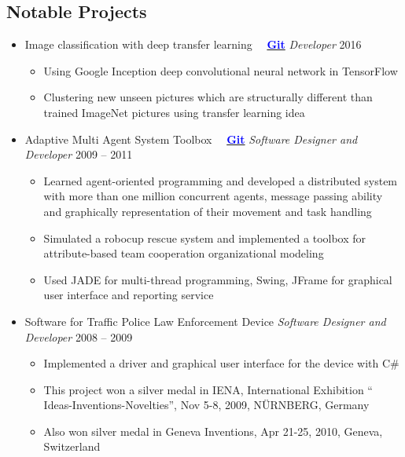\documentclass[letter]{res}
\begin{document}
\begin{resume}
		
		\section{Notable Projects}
		\begin{itemize}[leftmargin=-.1in]
			\item Image classification with deep transfer learning
			~~{\href{https://github.com/omid55/deep_transfer_learning}{\textbf{\textcolor{blue}{Git}}}} \newline
			{\sl Developer} \hfill 2016\\
			\vspace{-4mm}
			\iflong
			\begin{itemize}
				\item Using Google Inception deep convolutional neural network in TensorFlow
				\item Clustering new unseen pictures which are structurally different than trained ImageNet pictures using transfer learning idea
			\end{itemize}
			\fi
		
			\item Adaptive Multi Agent System Toolbox ~~{\href{https://github.com/omid55/team_based_rescue_jade_multi_agent_system}{\textbf{\textcolor{blue}{Git}}}} \newline
			{\sl Software Designer and Developer} \hfill 2009 – 2011\\
			\vspace{-4mm}
			\iflong
			\begin{itemize}
				\item Learned agent-oriented programming and developed a distributed system with more than one million concurrent agents, message passing ability and graphically representation of their movement and task handling
				\item Simulated a robocup rescue system and implemented a toolbox for 				attribute-based team cooperation organizational modeling
				\item Used JADE for multi-thread programming, Swing, JFrame for graphical user interface and reporting service
			\end{itemize}
			\fi
			
			\item Software for Traffic Police Law Enforcement Device \newline
			{\sl Software Designer and Developer} \hfill 2008 – 2009\\
			\vspace{-4mm}
			\iflong
			\begin{itemize}
				\item Implemented a driver and graphical user interface for the device with C\#
				\item This project won a silver medal in IENA, International Exhibition `` Ideas-Inventions-Novelties'', Nov 5-8, 2009, N\"{U}RNBERG, Germany
				\item Also won silver medal in Geneva Inventions, Apr 21-25, 2010, Geneva, Switzerland
			\end{itemize}
			\fi
			

\end{itemize}
\end{resume}
\end{document}
